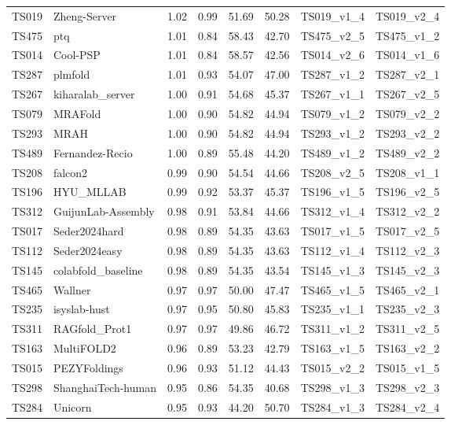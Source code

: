 \begin{longtable}{llllllll}
TS019 & Zheng-Server & 1.02 & 0.99 & 51.69 & 50.28 & TS019\_v1\_4 & TS019\_v2\_4 \\ 
TS475 & ptq & 1.01 & 0.84 & 58.43 & 42.70 & TS475\_v2\_5 & TS475\_v1\_2 \\ 
TS014 & Cool-PSP & 1.01 & 0.84 & 58.57 & 42.56 & TS014\_v2\_6 & TS014\_v1\_6 \\ 
TS287 & plmfold & 1.01 & 0.93 & 54.07 & 47.00 & TS287\_v1\_2 & TS287\_v2\_1 \\ 
TS267 & kiharalab\_server & 1.00 & 0.91 & 54.68 & 45.37 & TS267\_v1\_1 & TS267\_v2\_5 \\ 
TS079 & MRAFold & 1.00 & 0.90 & 54.82 & 44.94 & TS079\_v1\_2 & TS079\_v2\_2 \\ 
TS293 & MRAH & 1.00 & 0.90 & 54.82 & 44.94 & TS293\_v1\_2 & TS293\_v2\_2 \\ 
TS489 & Fernandez-Recio & 1.00 & 0.89 & 55.48 & 44.20 & TS489\_v1\_2 & TS489\_v2\_2 \\ 
TS208 & falcon2 & 0.99 & 0.90 & 54.54 & 44.66 & TS208\_v2\_5 & TS208\_v1\_1 \\ 
TS196 & HYU\_MLLAB & 0.99 & 0.92 & 53.37 & 45.37 & TS196\_v1\_5 & TS196\_v2\_5 \\ 
TS312 & GuijunLab-Assembly & 0.98 & 0.91 & 53.84 & 44.66 & TS312\_v1\_4 & TS312\_v2\_2 \\ 
TS017 & Seder2024hard & 0.98 & 0.89 & 54.35 & 43.63 & TS017\_v1\_5 & TS017\_v2\_5 \\ 
TS112 & Seder2024easy & 0.98 & 0.89 & 54.35 & 43.63 & TS112\_v1\_4 & TS112\_v2\_3 \\ 
TS145 & colabfold\_baseline & 0.98 & 0.89 & 54.35 & 43.54 & TS145\_v1\_3 & TS145\_v2\_3 \\ 
TS465 & Wallner & 0.97 & 0.97 & 50.00 & 47.47 & TS465\_v1\_5 & TS465\_v2\_1 \\ 
TS235 & isyslab-hust & 0.97 & 0.95 & 50.80 & 45.83 & TS235\_v1\_1 & TS235\_v2\_3 \\ 
TS311 & RAGfold\_Prot1 & 0.97 & 0.97 & 49.86 & 46.72 & TS311\_v1\_2 & TS311\_v2\_5 \\ 
TS163 & MultiFOLD2 & 0.96 & 0.89 & 53.23 & 42.79 & TS163\_v1\_5 & TS163\_v2\_2 \\ 
TS015 & PEZYFoldings & 0.96 & 0.93 & 51.12 & 44.43 & TS015\_v2\_2 & TS015\_v1\_5 \\ 
TS298 & ShanghaiTech-human & 0.95 & 0.86 & 54.35 & 40.68 & TS298\_v1\_3 & TS298\_v2\_3 \\ 
TS284 & Unicorn & 0.95 & 0.93 & 44.20 & 50.70 & TS284\_v1\_3 & TS284\_v2\_4 \\ 

\end{longtable}
